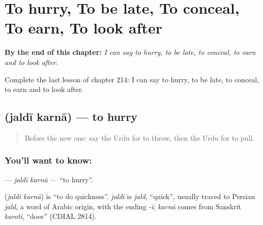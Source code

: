 
\chapter{To hurry, To be late, To conceal, To earn, To look after}
\label{ch:ur-to-hurry-to-be-late-to-conceal-to-earn-to-look-after}

\begin{chapteropening}
\textbf{By the end of this chapter:} \emph{I can say to hurry, to be late, to conceal, to earn and to look after.}

Complete the last lesson of chapter 214: I can say to hurry, to be late, to conceal, to earn and to look after.
\end{chapteropening}

\section[\texorpdfstring{\ur{جلدی} \ur{کرنا} (jaldī karnā)}{جلدی کرنا (jaldī karnā)}]{  (jaldī karnā) — to hurry}

\label{lesson:UR-C214-jaldi-karna}



\begin{quote}
Before the new one: say the Urdu for to throw, then the Urdu for to pull.
\end{quote}

\subsection*{You'll want to know:  }
\textbf{ } — \emph{jaldī karnā} — \textquotedblleft{}to hurry\textquotedblright{}.

\begin{cousinweb}
\textbf{ } (\emph{jaldī karnā}) is \textquotedblleft{}to do quickness\textquotedblright{}. \emph{jaldī} is \emph{jald}, \textquotedblleft{}quick\textquotedblright{}, usually traced to Persian \emph{jald}, a word of Arabic origin, with the ending \emph{-ī}; \emph{karnā} comes from Sanskrit \emph{karoti}, \textquotedblleft{}does\textquotedblright{} (CDIAL 2814).
\end{cousinweb}

